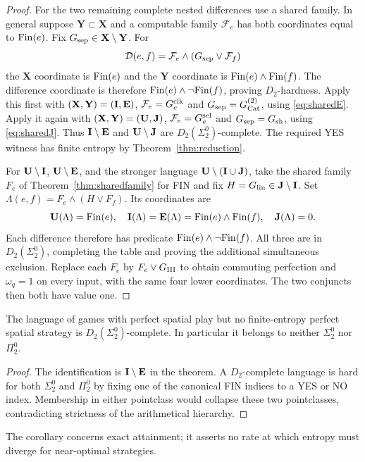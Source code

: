 \begin{proof}
For the two remaining complete nested differences use a shared family. In general suppose $\mathbf Y\subset\mathbf X$ and a computable family $\mathcal F_e$ has both coordinates equal to $\mathrm{Fin}(e)$. Fix $G_{\rm sep}\in\mathbf X\setminus\mathbf Y$. For
\begin{equation}\label{eq:sharedcriterion}
 \mathcal D(e,f)=\mathcal F_e\wedge(G_{\rm sep}\vee \mathcal F_f)
\end{equation}
the $\mathbf X$ coordinate is $\mathrm{Fin}(e)$ and the $\mathbf Y$ coordinate is $\mathrm{Fin}(e)\wedge \mathrm{Fin}(f)$. The difference coordinate is therefore $\mathrm{Fin}(e)\wedge\neg \mathrm{Fin}(f)$, proving $D_2$-hardness. Apply this first with $(\mathbf X,\mathbf Y)=(\mathbf I,\mathbf E)$, $\mathcal F_e=G^{\rm clk}_e$ and $G_{\rm sep}=G^{(2)}_{\operatorname{Cat}}$, using \eqref{eq:sharedE}. Apply it again with $(\mathbf X,\mathbf Y)=(\mathbf U,\mathbf J)$, $\mathcal F_e=G^{\rm sel}_e$ and $G_{\rm sep}=G_{\rm sh}$, using \eqref{eq:sharedJ}. Thus $\mathbf I\setminus\mathbf E$ and $\mathbf U\setminus\mathbf J$ are $D_2(\Sigma^0_2)$-complete. The required YES witness has finite entropy by Theorem~\ref{thm:reduction}.

For $\mathbf U\setminus\mathbf I$, $\mathbf U\setminus\mathbf E$, and the stronger language
$\mathbf U\setminus(\mathbf I\cup\mathbf J)$, take the shared family $F_e$ of
Theorem~\ref{thm:sharedfamily} for FIN and fix $H=G_{\rm lin}\in\mathbf J\setminus\mathbf I$.
Set $\Lambda(e,f)=F_e\wedge(H\vee F_f)$. Its coordinates are
\[
 \mathbf U(\Lambda)=\mathrm{Fin}(e),\quad
 \mathbf I(\Lambda)=\mathbf E(\Lambda)=\mathrm{Fin}(e)\wedge\mathrm{Fin}(f),\quad
 \mathbf J(\Lambda)=0.
\]
Each difference therefore has predicate $\mathrm{Fin}(e)\wedge\neg\mathrm{Fin}(f)$.
All three are in $D_2(\Sigma^0_2)$, completing the table and proving
the additional simultaneous exclusion. Replace each $F_e$ by
$F_e\vee G_{\mathrm{III}}$ to obtain commuting perfection and $\omega_q=1$
on every input, with the same four lower coordinates. The two
conjuncts then both have value one.
\end{proof}

\begin{corollary}\label{cor:entropyonly}
The language of games with perfect spatial play but no finite-entropy perfect spatial strategy is $D_2(\Sigma^0_2)$-complete. In particular it belongs to neither $\Sigma^0_2$ nor $\Pi^0_2$.
\end{corollary}
\begin{proof}
The identification is $\mathbf I\setminus\mathbf E$ in the theorem. A $D_2$-complete language is hard for both $\Sigma^0_2$ and $\Pi^0_2$ by fixing one of the canonical FIN indices to a YES or NO index. Membership in either pointclass would collapse these two pointclasses, contradicting strictness of the arithmetical hierarchy.
\end{proof}
The corollary concerns exact attainment; it asserts no rate at which entropy must diverge for near-optimal strategies.

